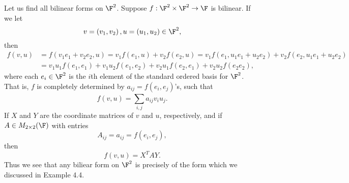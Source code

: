 \documentclass[linearalgebraII]{subfiles}
\begin{document}
    \begin{example}
        Let us find all bilinear forms on $\F^2$. Suppose $f:\F^2\times\F^2\to\F$ is bilinear. If we let
        \begin{equation*}
            v = \left( v_1,v_2 \right) , u = \left( u_1,u_2 \right) \in\F^2,
        \end{equation*}
        then
        \begin{align*}
            f(v,u) & = f\left( v_1e_1+v_2e_2, u \right) = v_1f\left( e_1,u \right) + v_2f\left( e_2,u \right) = v_1f\left( e_1,u_1e_1+u_2e_2 \right) + v_2f\left( e_2,u_1e_1+u_2e_2 \right) \\
                   & = v_1u_1f\left( e_1,e_1 \right) + v_1u_2f\left( e_1,e_2 \right) + v_2u_1f\left( e_2,e_1 \right) + v_2u_2f\left( e_2e_2 \right) ,
        \end{align*} 
        where each $e_i\in\F^2$ is the $i$th element of the standard ordered basis for $\F^2$. That is, $f$ is completely determined by $a_{ij}=f(e_i,e_j)$'s, such that
        \begin{equation*}
            f(v,u) = \sum^{}_{i,j} a_{ij}v_iu_j.
        \end{equation*}
        If $X$ and $Y$ are the coordinate matrices of $v$ and $u$, respectively, and if $A\in M_{2\times 2}(\F)$ with entries
        \begin{equation*}
            A_{ij} = a_{ij} = f\left( e_i,e_j \right) ,
        \end{equation*}
        then
        \begin{equation*}
            f(v,u) = X^TAY.
        \end{equation*}
        Thus we see that any biliear form on $\F^2$ is precisely of the form which we discussed in Example 4.4.
    \end{example}
\end{document}
